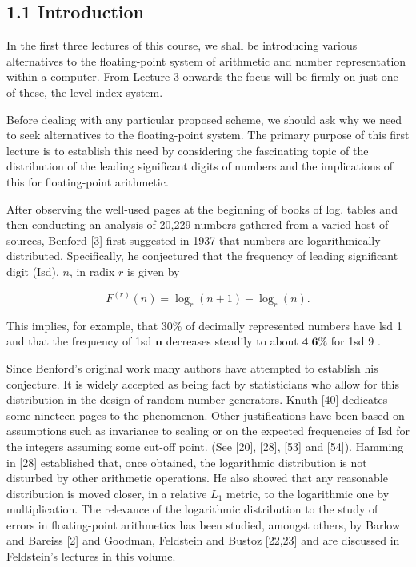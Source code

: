 \documentclass[10pt]{article}
\begin{document}
\subsection*{1.1 Introduction}
In the first three lectures of this course, we shall be introducing various alternatives to the floating-point system of arithmetic and number representation within a computer. From Lecture 3 onwards the focus will be firmly on just one of these, the level-index system.

Before dealing with any particular proposed scheme, we should ask why we need to seek alternatives to the floating-point system. The primary purpose of this first lecture is to establish this need by considering the fascinating topic of the distribution of the leading significant digits of numbers and the implications of this for floating-point arithmetic.

After observing the well-used pages at the beginning of books of log. tables and then conducting an analysis of 20,229 numbers gathered from a varied host of sources, Benford [3] first suggested in 1937 that numbers are logarithmically distributed. Specifically, he conjectured that the frequency of leading significant digit (Isd), $n$, in radix $r$ is given by

$$
F^{(r)}(n)=\log _{r}(n+1)-\log _{r}(n) .
$$

This implies, for example, that $30 \%$ of decimally represented numbers have lsd 1 and that the frequency of 1sd $\mathbf{n}$ decreases steadily to about $\mathbf{4 . 6 \%}$ for 1sd 9 .

Since Benford's original work many authors have attempted to establish his conjecture. It is widely accepted as being fact by statisticians who allow for this distribution in the design of random number generators. Knuth [40] dedicates some nineteen pages to the phenomenon. Other justifications have been based on assumptions such as invariance to scaling or on the expected frequencies of Isd for the integers assuming some cut-off point. (See [20], [28], [53] and [54]). Hamming in [28] established that, once obtained, the logarithmic distribution is not disturbed by other arithmetic operations. He also showed that any reasonable distribution is moved closer, in a relative $L_{1}$ metric, to the logarithmic one by multiplication. The relevance of the logarithmic distribution to the study of errors in floating-point arithmetics has been studied, amongst others, by Barlow and Bareiss [2] and Goodman, Feldstein and Bustoz [22,23] and are discussed in Feldstein's lectures in this volume.
\end{document}
